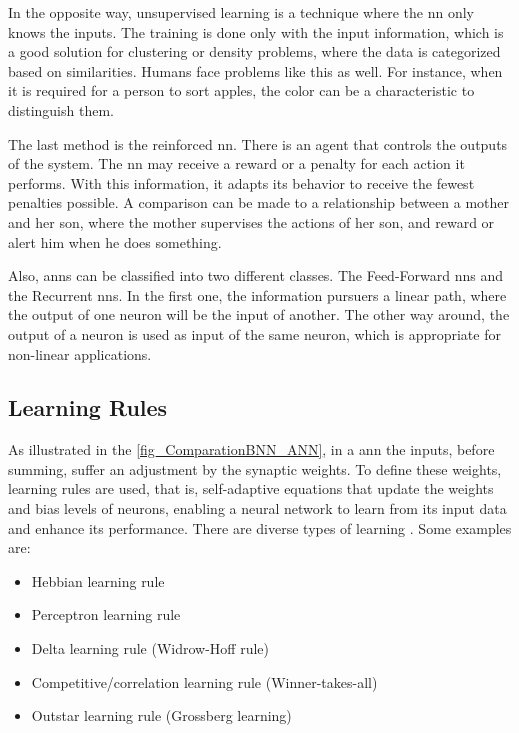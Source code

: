 In the opposite way, unsupervised learning is a technique where the \gls{nn} only knows the inputs. The training is done only with the input information, which is a good solution for clustering or density problems, where the data is categorized based on similarities. Humans face problems like this as well. For instance, when it is required for a person to sort apples, the color can be a characteristic to distinguish them. 

The last method is the reinforced \gls{nn}. There is an agent that controls the outputs of the system. The \gls{nn} may receive a reward or a penalty for each action it performs. With this information, it adapts its behavior to receive the fewest penalties possible. A comparison can be made to a relationship between a mother and her son, where the mother supervises the actions of her son, and reward or alert him when he does something.

Also, \glspl{ann} can be classified into two different classes. The Feed-Forward \glspl{nn} and the Recurrent \glspl{nn}. In the first one, the information pursuers a linear path, where the output of one neuron will be the input of another. The other way around, the output of a neuron is used as input of the same neuron, which is appropriate for non-linear applications. 

\subsection{Learning Rules}

As illustrated in the \autoref{fig_ComparationBNN_ANN}, in a \gls{ann} the inputs, before summing, suffer an adjustment by the synaptic weights. To define these weights, learning rules are used, that is, self-adaptive equations that update the weights and bias levels of neurons, enabling a neural network to learn from its input data and enhance its performance. There are diverse types of learning \cite{haykin2009neural}. Some examples are:

\begin{itemize}
    \item Hebbian learning rule
    \item Perceptron learning rule
    \item Delta learning rule (Widrow-Hoff rule)
    \item Competitive/correlation learning rule (Winner-takes-all)
    \item Outstar learning rule (Grossberg learning)
\end{itemize}


